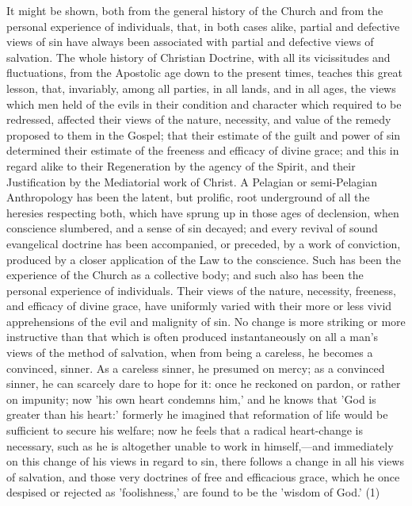 \documentclass[
]{book}
\begin{document}
It might be shown, both from the general history of the Church and from the personal experience of individuals, that, in both cases alike, partial and defective views of sin have always been associated with partial and defective views of salvation. The whole history of Christian Doctrine, with all its vicissitudes and fluctuations, from the Apostolic age down to the present times, teaches this great lesson, that, invariably, among all parties, in all lands, and in all ages, the views which men held of the evils in their condition and character which required to be redressed, affected their views of the nature, necessity, and value of the remedy proposed to them in the Gospel; that their estimate of the guilt and power of sin determined their estimate of the freeness and efficacy of divine grace; and this in regard alike to their Regeneration by the agency of the Spirit, and their Justification by the Mediatorial work of Christ. A Pelagian or semi-Pelagian Anthropology has been the latent, but prolific, root underground of all the heresies respecting both, which have sprung up in those ages of declension, when conscience slumbered, and a sense of sin decayed; and every revival of sound evangelical doctrine has been accompanied, or preceded, by a work of conviction, produced by a closer application of the Law to the conscience. Such has been the experience of the Church as a collective body; and such also has been the personal experience of individuals. Their views of the nature, necessity, freeness, and efficacy of divine grace, have uniformly varied with their more or less vivid apprehensions of the evil and malignity of sin. No change is more striking or more instructive than that which is often produced instantaneously on all a man's views of the method of salvation, when from being a careless, he becomes a convinced, sinner. As a careless sinner, he presumed on mercy; as a convinced sinner, he can scarcely dare to hope for it: once he reckoned on pardon, or rather on impunity; now 'his own heart condemns him,' and he knows that 'God is greater than his heart:' formerly he imagined that reformation of life would be sufficient to secure his welfare; now he feels that a radical heart-change is necessary, such as he is altogether unable to work in himself,---and immediately on this change of his views in regard to sin, there follows a change in all his views of salvation, and those very doctrines of free and efficacious grace, which he once despised or rejected as 'foolishness,' are found to be the 'wisdom of God.' (1)
\end{document}
